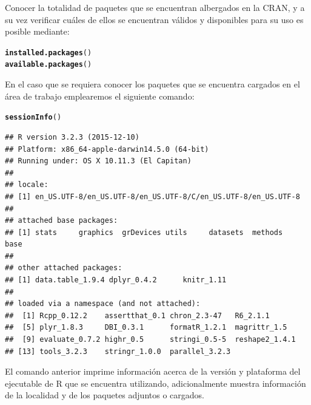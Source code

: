 \documentclass[11pt,a4paper,oneside]{book}\usepackage[]{graphicx}\usepackage[]{color}
\makeatletter
\newcommand{\hlstd}[1]{\textcolor[rgb]{0.345,0.345,0.345}{#1}}%
\newcommand{\hlkwd}[1]{\textcolor[rgb]{0.737,0.353,0.396}{\textbf{#1}}}%
\newenvironment{kframe}{%
 \def\at@end@of@kframe{}%
 \ifinner\ifhmode%
  \def\at@end@of@kframe{\end{minipage}}%
  \begin{minipage}{\columnwidth}%
 \fi\fi%
 \def\FrameCommand##1{\hskip\@totalleftmargin \hskip-\fboxsep
 \colorbox{shadecolor}{##1}\hskip-\fboxsep
     \hskip-\linewidth \hskip-\@totalleftmargin \hskip\columnwidth}%
 \MakeFramed {\advance\hsize-\width
   \@totalleftmargin\z@ \linewidth\hsize
   \@setminipage}}%
 {\par\unskip\endMakeFramed%
 \at@end@of@kframe}
\newenvironment{knitrout}{}{} %
\makeatother
\begin{document}
\begin{itemize}
Conocer la totalidad de paquetes que se encuentran albergados en la CRAN, y a su vez verificar cuáles de ellos se encuentran válidos y disponibles para su uso es posible mediante:
\begin{knitrout}
\color{fgcolor}\begin{kframe}
\begin{alltt}
\hlkwd{installed.packages}\hlstd{()}
\hlkwd{available.packages}\hlstd{()}
\end{alltt}
\end{kframe}
\end{knitrout}
En el caso que se requiera conocer los paquetes que se encuentra cargados en el área de trabajo emplearemos el siguiente comando:
\begin{knitrout}
\color{fgcolor}\begin{kframe}
\begin{alltt}
\hlkwd{sessionInfo}\hlstd{()}
\end{alltt}
\begin{verbatim}
## R version 3.2.3 (2015-12-10)
## Platform: x86_64-apple-darwin14.5.0 (64-bit)
## Running under: OS X 10.11.3 (El Capitan)
## 
## locale:
## [1] en_US.UTF-8/en_US.UTF-8/en_US.UTF-8/C/en_US.UTF-8/en_US.UTF-8
## 
## attached base packages:
## [1] stats     graphics  grDevices utils     datasets  methods   base     
## 
## other attached packages:
## [1] data.table_1.9.4 dplyr_0.4.2      knitr_1.11      
## 
## loaded via a namespace (and not attached):
##  [1] Rcpp_0.12.2    assertthat_0.1 chron_2.3-47   R6_2.1.1      
##  [5] plyr_1.8.3     DBI_0.3.1      formatR_1.2.1  magrittr_1.5  
##  [9] evaluate_0.7.2 highr_0.5      stringi_0.5-5  reshape2_1.4.1
## [13] tools_3.2.3    stringr_1.0.0  parallel_3.2.3
\end{verbatim}
\end{kframe}
\end{knitrout}
El comando anterior imprime información acerca de la versión y plataforma del ejecutable de R que se encuentra utilizando, adicionalmente muestra información de la localidad y de los paquetes adjuntos o cargados.\newline


\end{itemize}
\end{document}
